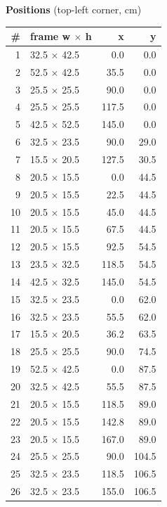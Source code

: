 \documentclass[a4paper,landscape,10pt]{article}
\begin{document}
\begin{minipage}[t]{0.25\textwidth}
\vspace{8pt}
{\bfseries Positions} (top-left corner, cm)\\[2pt]
\tiny
\begin{tabular}{@{}r l r r@{}}
\toprule
\# & frame w $\times$ h & x & y \\
\midrule
1 & 32.5 $\times$ 42.5 & 0.0 & 0.0 \\
2 & 52.5 $\times$ 42.5 & 35.5 & 0.0 \\
3 & 25.5 $\times$ 25.5 & 90.0 & 0.0 \\
4 & 25.5 $\times$ 25.5 & 117.5 & 0.0 \\
5 & 42.5 $\times$ 52.5 & 145.0 & 0.0 \\
6 & 32.5 $\times$ 23.5 & 90.0 & 29.0 \\
7 & 15.5 $\times$ 20.5 & 127.5 & 30.5 \\
8 & 20.5 $\times$ 15.5 & 0.0 & 44.5 \\
9 & 20.5 $\times$ 15.5 & 22.5 & 44.5 \\
10 & 20.5 $\times$ 15.5 & 45.0 & 44.5 \\
11 & 20.5 $\times$ 15.5 & 67.5 & 44.5 \\
12 & 20.5 $\times$ 15.5 & 92.5 & 54.5 \\
13 & 23.5 $\times$ 32.5 & 118.5 & 54.5 \\
14 & 42.5 $\times$ 32.5 & 145.0 & 54.5 \\
15 & 32.5 $\times$ 23.5 & 0.0 & 62.0 \\
16 & 32.5 $\times$ 23.5 & 55.5 & 62.0 \\
17 & 15.5 $\times$ 20.5 & 36.2 & 63.5 \\
18 & 25.5 $\times$ 25.5 & 90.0 & 74.5 \\
19 & 52.5 $\times$ 42.5 & 0.0 & 87.5 \\
20 & 32.5 $\times$ 42.5 & 55.5 & 87.5 \\
21 & 20.5 $\times$ 15.5 & 118.5 & 89.0 \\
22 & 20.5 $\times$ 15.5 & 142.8 & 89.0 \\
23 & 20.5 $\times$ 15.5 & 167.0 & 89.0 \\
24 & 25.5 $\times$ 25.5 & 90.0 & 104.5 \\
25 & 32.5 $\times$ 23.5 & 118.5 & 106.5 \\
26 & 32.5 $\times$ 23.5 & 155.0 & 106.5 \\
\bottomrule
\end{tabular}
\end{minipage}
\clearpage
\end{document}

